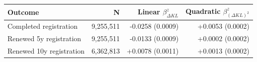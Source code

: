 \begin{tabular}{lrrr}
\toprule
Outcome & N & Linear $\beta_{\Delta KL}^z$ & Quadratic $\beta_{(\Delta KL)^2}^z$ \\
\midrule
Completed registration & 9,255,511 & -0.0258 (0.0009) & +0.0053 (0.0002) \\
Renewed 5y registration & 9,255,511 & -0.0133 (0.0009) & +0.0002 (0.0002) \\
Renewed 10y registration & 6,362,813 & +0.0078 (0.0011) & +0.0013 (0.0002) \\
\bottomrule
\end{tabular}
